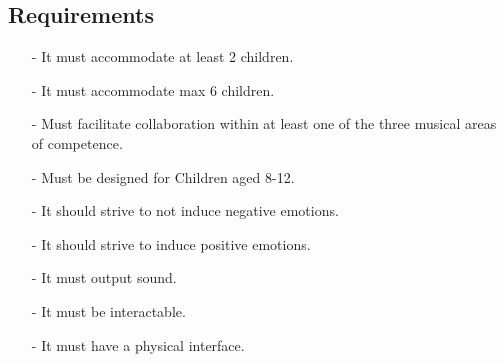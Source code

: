 	\subsection*{Requirements}
		\begin{itemize}
			\item[-] It must accommodate at least 2 children.\\
			\item[-] It must accommodate max 6 children.\\
			\item[-] Must facilitate collaboration within at least one of the three musical areas of competence.\\
			\item[-] Must be designed for Children aged 8-12.\\
			\item[-] It should strive to not induce  negative emotions.\\
			\item[-] It should strive to induce positive emotions.\\
			\item[-] It must output sound.	\\	
			\item[-] It must be interactable.\\
			\item[-] It must have a physical interface.\\
		\end{itemize}
	
















		